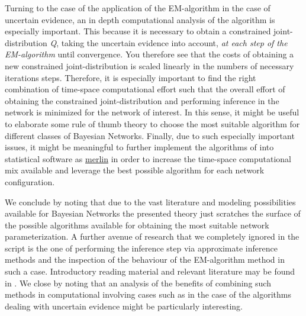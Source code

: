 \documentclass[11pt]{article}
\begin{document}
\begin{article}
Turning to the case of the application of the EM-algorithm in the
case of uncertain evidence, an in depth computational analysis of
the algorithm is especially important. This because it is necessary
to obtain a constrained joint-distribution \emph{Q}, taking the uncertain
evidence into account, \emph{at each step of the EM-algorithm} until
convergence. You therefore see that the costs of obtaining a new
constrained joint-distribution is scaled linearly in the numbers of
necessary iterations steps. Therefore, it is especially important
to find the right combination of time-space computational effort
such that the overall effort of obtaining the constrained
joint-distribution and performing inference in the network is
minimized for the network of interest. In this sense, it might be
useful to elaborate some rule of thumb theory to choose the most
suitable algorithm for different classes of Bayesian
Networks. Finally, due to such especially important issues, it might
be meaningful to further implement the algorithms of
\cite{Valtorta_2002} into statistical software as \href{https://github.com/radum2275/merlin}{merlin} in order to
increase the time-space computational mix available and leverage
the best possible algorithm for each network configuration.

We conclude by noting that due to the vast literature and modeling
possibilities available for Bayesian Networks the presented theory
just scratches the surface of the possible algorithms available for
obtaining the most suitable network parameterization. A further
avenue of research that we completely ignored in the script is
the one of performing the inference step via approximate inference
methods and the inspection of the behaviour of the EM-algorithm
method in such a case. Introductory reading material and relevant
literature may be found in \cite{koller2009probabilistic}. We close
by noting that an analysis of the benefits of combining such methods
in computational involving cases such as in the case of the
algorithms dealing with uncertain evidence might be particularly
interesting.

\newpage





\cleardoublepage

\end{article}
\end{document}
